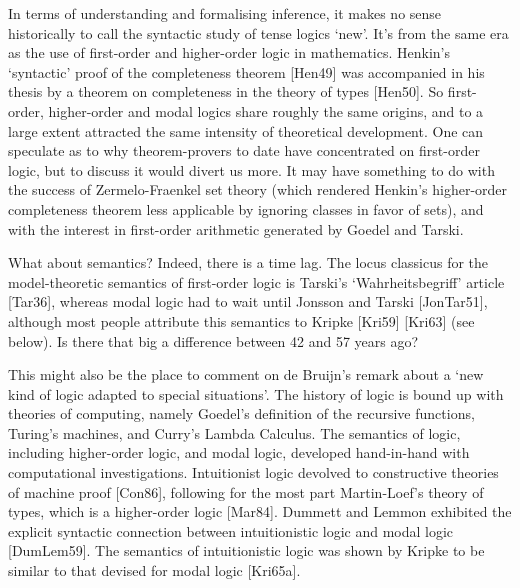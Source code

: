 \begin{spec}
In terms of understanding and formalising inference, it makes no
sense historically to call the syntactic study of tense logics
`new'.  It's from the same era as the use of first-order and
higher-order logic in mathematics. Henkin's `syntactic' proof of the
completeness theorem [Hen49] was accompanied in his thesis by a
theorem on completeness in the theory of types [Hen50]. So
first-order, higher-order and modal logics share roughly the same
origins, and to a large extent attracted the same intensity of
theoretical development.  One can speculate as to why
theorem-provers to date have concentrated on first-order logic, but
to discuss it would divert us more. It may have something to do with
the success of Zermelo-Fraenkel set theory (which rendered Henkin's
higher-order completeness theorem less applicable by ignoring
classes in favor of sets), and with the interest in first-order
arithmetic generated by Goedel and Tarski.

What about semantics? Indeed, there is a time lag. The locus
classicus for the model-theoretic semantics of first-order logic is
Tarski's `Wahrheitsbegriff' article [Tar36], whereas modal logic had
to wait until Jonsson and Tarski [JonTar51], although most people
attribute this semantics to Kripke [Kri59] [Kri63] (see below). Is
there that big a difference between 42 and 57 years ago?

This might also be the place to comment on de Bruijn's remark about
a `new kind of logic adapted to special situations'. The history of
logic is bound up with theories of computing, namely Goedel's
definition of the recursive functions, Turing's machines, and
Curry's Lambda Calculus.  The semantics of logic, including
higher-order logic, and modal logic, developed hand-in-hand with
computational investigations.  Intuitionist logic devolved to
constructive theories of machine proof [Con86], following for the
most part Martin-Loef's theory of types, which is a higher-order
logic [Mar84]. Dummett and Lemmon exhibited the explicit syntactic
connection between intuitionistic logic and modal logic [DumLem59].
The semantics of intuitionistic logic was shown by Kripke to be
similar to that devised for modal logic [Kri65a].


\end{spec}
